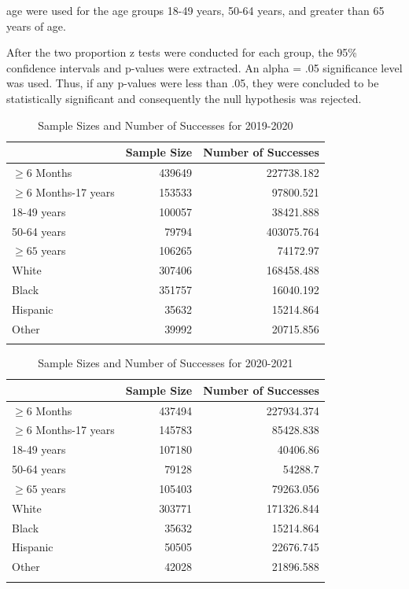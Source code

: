 \documentclass[12pt]{article}
\begin{document}
age were used for the age groups 18-49 years, 50-64 years, and greater than 65 years of age. \par
After the two proportion z tests were conducted for each group, the 95\% confidence intervals and p-values were extracted. An alpha = .05 significance level was used. Thus, if any p-values were less than
.05, they were concluded to be statistically significant and consequently the null hypothesis was rejected.
\begin{table}[ht!]
    \centering
    \caption{Sample Sizes and Number of Successes for 2019-2020}
    \label{tab:table:sizes}
     \begin{tabularx}{.8\textwidth}{X rr}
      \lsptoprule
                &Sample Size & Number of Successes\\
      \midrule
      $\ge 6$ Months & 439649 & 227738.182\\
      $\ge6$ Months-17 years  &   153533  &    97800.521 \\
      18-49 years  &   100057  &    38421.888  \\
      50-64 years &   79794  &    403075.764 \\
      $\ge 65$ years  &   106265  &    74172.97\\
      White & 307406 & 168458.488 \\
      Black & 351757 & 16040.192 \\
      Hispanic & 35632 & 15214.864 \\
      Other & 39992 & 20715.856 \\
      \lspbottomrule
     \end{tabularx}
    \end{table}

\begin{table}[ht!]
    \centering
    \caption{Sample Sizes and Number of Successes for 2020-2021}
    \label{tab:table:sizes2}
     \begin{tabularx}{.8\textwidth}{X rr}
      \lsptoprule
                &Sample Size & Number of Successes\\
      \midrule
      $\ge 6$ Months & 437494 & 227934.374\\
      $\ge6$ Months-17 years  &   145783  &    85428.838 \\
      18-49 years  &   107180  &    40406.86  \\
      50-64 years &   79128  &    54288.7 \\
      $\ge 65$ years  &   105403  &    79263.056\\
      White & 303771 & 171326.844 \\
      Black & 35632 & 15214.864 \\
      Hispanic & 50505 & 22676.745 \\
      Other & 42028 & 21896.588 \\
      \lspbottomrule
     \end{tabularx}
    \end{table}
\end{document}
